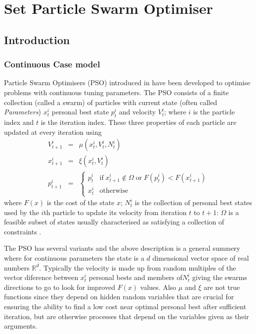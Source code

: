 \documentclass[a4paper,oneside,english]{book}
\numberwithin{equation}{section}
\numberwithin{figure}{section}
\begin{document}
	\chapter{Set Particle Swarm Optimiser}
\section{Introduction}
\subsection{Continuous Case model}
Particle Swarm Optimisers (PSO) introduced in \cite{KE-pso} have been developed to optimise problems with continuous tuning parameters. The PSO consists of a finite collection (called a swarm) of particles with current state (often called \textit{Parameters}) $x_t^i$ personal best state $p_t^i$ and velocity $V_t^i$; where $i$ is the particle index and $t$ is the iteration index. These three properties of each particle are updated at every iteration using 
\begin{align}
V_{t+1}^i&=&\mu \left(x_t^i,V_t^i,N_t^i\right)\\
x_{t+1}^i&=&\xi \left(x_t^i,V_t^i\right)\\
p_{t+1}^i&=&\left\lbrace \begin{array}{cc}
p_t^i& \mathrm{if}\; x_{t+1}^i\notin \varOmega \;\mathrm{or}\; F(p_t^i)<F(x_{t+1}^i)  \\ 
x_t^i&\mathrm{otherwise} 
\end{array}\right. 
\end{align} 
where $F(x)$ is the cost of the state $x$; $N_t^i$ is the  collection of personal best states used by the $i$th particle to update its velocity from iteration $t$ to $t+1$: $\varOmega$ is a feasible  subset of states usually characterised as satisfying a collection of constraints . 

The PSO has several variants and the above description is a general summery where for continuous parameters the state is a $d$ dimensional vector space of real numbers $\mathbb{R}^d$. Typically the velocity is made up from random multiples of the vector diference between $x_t^i$ personal bests and members of$N_t^i$ giving the swarms directions to go to look for improved $F(x)$ values. Also $\mu$ and $\xi$ are not true functions since they depend on hidden random variables that are crucial for ensuring the ability to find a low cost near optimal personal best after sufficient iteration, but are otherwise processes that depend on the variables given as their arguments.
 
\end{document}
